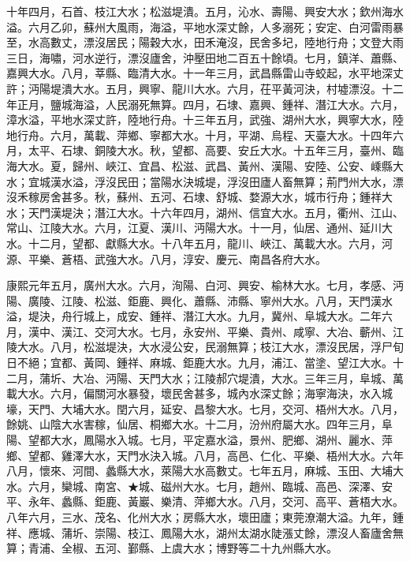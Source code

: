 \begin{pinyinscope}
十年四月，石首、枝江大水；松滋堤潰。五月，沁水、壽陽、興安大水；欽州海水溢。六月乙卯，蘇州大風雨，海溢，平地水深丈餘，人多溺死；安定、白河雷雨暴至，水高數丈，漂沒居民；陽穀大水，田禾淹沒，民舍多圮，陸地行舟；文登大雨三日，海嘯，河水逆行，漂沒廬舍，沖壓田地二百五十餘頃。七月，鎮洋、蕭縣、嘉興大水。八月，莘縣、臨清大水。十一年三月，武昌縣雷山寺蛟起，水平地深丈許；沔陽堤潰大水。五月，興寧、龍川大水。六月，茌平黃河決，村墟漂沒。十二年正月，鹽城海溢，人民溺死無算。四月，石埭、嘉興、鍾祥、潛江大水。六月，漳水溢，平地水深丈許，陸地行舟。十三年五月，武強、湖州大水，興寧大水，陸地行舟。六月，萬載、萍鄉、寧都大水。十月，平湖、烏程、天臺大水。十四年六月，太平、石埭、銅陵大水。秋，望都、高要、安丘大水。十五年三月，臺州、臨海大水。夏，歸州、峽江、宜昌、松滋、武昌、黃州、漢陽、安陸、公安、嵊縣大水；宜城漢水溢，浮沒民田；當陽水決城堤，浮沒田廬人畜無算；荊門州大水，漂沒禾稼房舍甚多。秋，蘇州、五河、石埭、舒城、婺源大水，城市行舟；鍾祥大水；天門漢堤決；潛江大水。十六年四月，湖州、信宜大水。五月，衢州、江山、常山、江陵大水。六月，江夏、漢川、沔陽大水。十一月，仙居、通州、延川大水。十二月，望都、獻縣大水。十八年五月，龍川、峽江、萬載大水。六月，河源、平樂、蒼梧、武強大水。八月，淳安、慶元、南昌各府大水。

康熙元年五月，廣州大水。六月，洵陽、白河、興安、榆林大水。七月，孝感、沔陽、廣陵、江陵、松滋、鉅鹿、興化、蕭縣、沛縣、寧州大水。八月，天門漢水溢，堤決，舟行城上，成安、鍾祥、潛江大水。九月，冀州、阜城大水。二年六月，漢中、漢江、交河大水。七月，永安州、平樂、貴州、咸寧、大冶、蘄州、江陵大水。八月，松滋堤決，大水浸公安，民溺無算；枝江大水，漂沒民居，浮尸旬日不絕；宜都、黃岡、鍾祥、麻城、鉅鹿大水。九月，浦江、當塗、望江大水。十二月，蒲圻、大冶、沔陽、天門大水；江陵郝穴堤潰，大水。三年三月，阜城、萬載大水。六月，偏關河水暴發，壞民舍甚多，城內水深丈餘；海寧海決，水入城壕，天門、大埔大水。閏六月，延安、昌黎大水。七月，交河、梧州大水。八月，餘姚、山陰大水害稼，仙居、桐鄉大水。十二月，汾州府屬大水。四年三月，阜陽、望都大水，鳳陽水入城。七月，平定嘉水溢，景州、肥鄉、湖州、麗水、萍鄉、望都、雞澤大水，天門水決入城。八月，高邑、仁化、平樂、梧州大水。六年八月，懷來、河間、蠡縣大水，萊陽大水高數丈。七年五月，麻城、玉田、大埔大水。六月，欒城、南宮、★城、磁州大水。七月，趙州、臨城、高邑、深澤、安平、永年、蠡縣、鉅鹿、黃巖、樂清、萍鄉大水。八月，交河、高平、蒼梧大水。八年六月，三水、茂名、化州大水；房縣大水，壞田廬；東莞潦潮大溢。九年，鍾祥、應城、蒲圻、崇陽、枝江、鳳陽大水，湖州太湖水陡漲丈餘，漂沒人畜廬舍無算；青浦、全椒、五河、鄞縣、上虞大水；博野等二十九州縣大水。


\end{pinyinscope}
